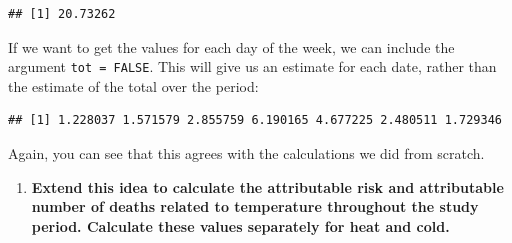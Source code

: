 \documentclass[
]{book}
\newenvironment{Shaded}{\begin{snugshade}}{\end{snugshade}}
\newcommand{\AttributeTok}[1]{\textcolor[rgb]{0.13,0.29,0.53}{#1}}
\newcommand{\ConstantTok}[1]{\textcolor[rgb]{0.56,0.35,0.01}{#1}}
\newcommand{\DecValTok}[1]{\textcolor[rgb]{0.00,0.00,0.81}{#1}}
\newcommand{\FunctionTok}[1]{\textcolor[rgb]{0.13,0.29,0.53}{\textbf{#1}}}
\newcommand{\NormalTok}[1]{#1}
\newcommand{\SpecialCharTok}[1]{\textcolor[rgb]{0.81,0.36,0.00}{\textbf{#1}}}
\newcommand{\StringTok}[1]{\textcolor[rgb]{0.31,0.60,0.02}{#1}}
\providecommand{\tightlist}{%
  \setlength{\itemsep}{0pt}\setlength{\parskip}{0pt}}
\begin{document}
\begin{Shaded}
\end{Shaded}

\begin{verbatim}
## [1] 20.73262
\end{verbatim}

If we want to get the values for each day of the week, we can include the argument \texttt{tot\ =\ FALSE}. This will give us an estimate for each date, rather than the estimate of the total over the period:

\begin{Shaded}
\end{Shaded}

\begin{verbatim}
## [1] 1.228037 1.571579 2.855759 6.190165 4.677225 2.480511 1.729346
\end{verbatim}

Again, you can see that this agrees with the calculations we did from scratch.

\begin{enumerate}
\def\labelenumi{\arabic{enumi}.}
\setcounter{enumi}{1}
\tightlist
\item
  \textbf{Extend this idea to calculate the attributable risk and attributable number of deaths related to temperature throughout the study period. Calculate these values separately for heat and cold.}
\end{enumerate}
\end{document}
